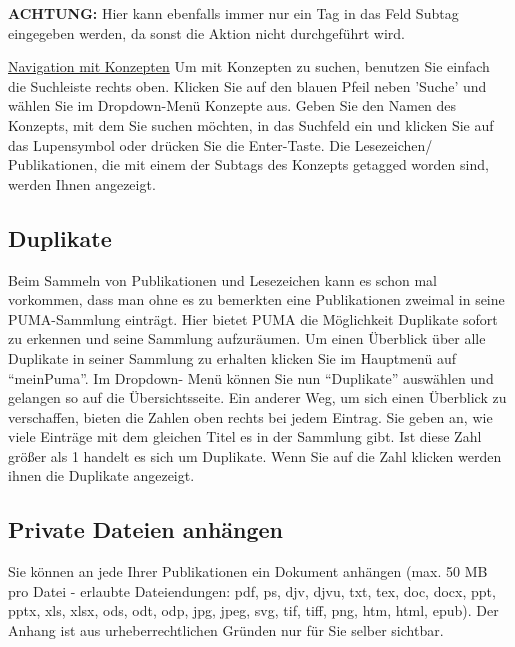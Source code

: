 \documentclass[b5paper,11pt,twoside]{scrbook} %
\begin{document}
\begin{shaded} 
\centering\textbf{ACHTUNG:} Hier kann ebenfalls immer nur ein Tag in das Feld Subtag eingegeben werden, da sonst die Aktion nicht durchgeführt wird.
\end{shaded}
\underline{Navigation mit Konzepten}
\newline
Um mit Konzepten zu suchen, benutzen Sie einfach die Suchleiste rechts oben. Klicken Sie auf den blauen Pfeil neben 'Suche' und wählen Sie im Dropdown-Menü Konzepte aus. Geben Sie den Namen des Konzepts, mit dem Sie suchen möchten, in das Suchfeld ein und klicken Sie auf das Lupensymbol oder drücken Sie die Enter-Taste. Die Lesezeichen/ Publikationen, die mit einem der Subtags des Konzepts getagged worden sind, werden Ihnen angezeigt. 
\subsection{Duplikate}
Beim Sammeln von Publikationen und Lesezeichen kann es schon mal vorkommen, dass man ohne es zu bemerkten eine Publikationen zweimal in seine PUMA-Sammlung einträgt. Hier bietet PUMA die Möglichkeit Duplikate sofort zu erkennen und seine Sammlung aufzuräumen. Um einen Überblick über alle Duplikate in seiner Sammlung zu erhalten klicken Sie im Hauptmenü auf \enquote{meinPuma}. Im Dropdown- Menü können Sie nun \enquote{Duplikate} auswählen und gelangen so auf die Übersichtsseite. Ein anderer Weg, um sich einen Überblick zu verschaffen, bieten die Zahlen oben rechts bei jedem Eintrag. Sie geben an, wie viele Einträge mit dem gleichen Titel es in der Sammlung gibt. Ist diese Zahl größer als 1 handelt es sich um Duplikate. Wenn Sie auf die Zahl klicken werden ihnen die Duplikate angezeigt.
\subsection{Private Dateien anhängen}
Sie können an jede Ihrer Publikationen ein Dokument anhängen (max. 50 MB pro Datei - erlaubte Dateiendungen: pdf, ps, djv, djvu, txt, tex, doc, docx, ppt, pptx, xls, xlsx, ods, odt, odp, jpg, jpeg, svg, tif, tiff, png, htm, html, epub). Der Anhang ist aus urheberrechtlichen Gründen nur für Sie selber sichtbar.
\end{document}
